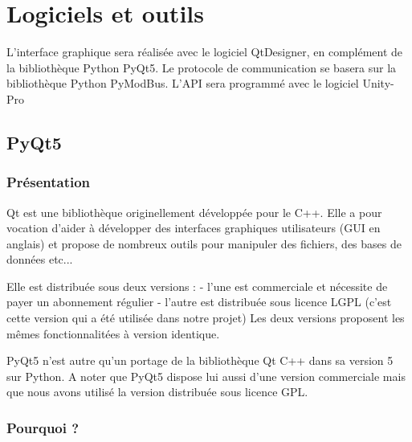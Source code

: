 \documentclass[12pt]{report}    %
\begin{document}
\chapter{Logiciels et outils}


L'interface graphique sera réalisée avec le logiciel QtDesigner, en complément de la bibliothèque Python PyQt5.
Le protocole de communication se basera sur la bibliothèque Python PyModBus.
L'API sera programmé avec le logiciel Unity-Pro

\section{PyQt5}

\subsection{Présentation}

Qt est une bibliothèque originellement développée pour le C++. Elle a pour vocation d'aider à développer des interfaces graphiques utilisateurs (GUI en anglais) et propose de nombreux outils pour manipuler des fichiers, des bases de données etc...\newline

Elle est distribuée sous deux versions : \newline
- l'une est commerciale et nécessite de payer un abonnement régulier\newline
- l'autre est distribuée sous licence LGPL (c'est cette version qui a été utilisée dans notre projet)
\smallSkip
Les deux versions proposent les mêmes fonctionnalitées à version identique.

\smallSkip
PyQt5 n'est autre qu'un portage de la bibliothèque Qt C++ dans sa version 5 sur Python.\newline
A noter que PyQt5 dispose lui aussi d'une version commerciale mais que nous avons utilisé la version distribuée sous licence GPL.

\subsection{Pourquoi ?}
\end{document}
